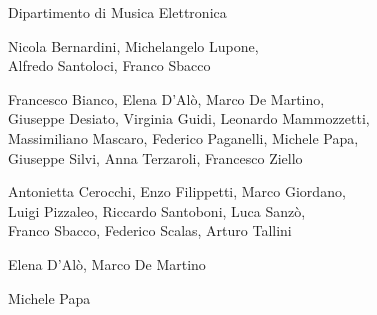 

%
%
	
{\fontsize{24}{22} }

\medskip

{\fontsize{12}{12} \textsf{Dipartimento di Musica Elettronica}}

\vspace{.5cm}

\textbf{}

Nicola Bernardini, Michelangelo Lupone, \\ Alfredo Santoloci, Franco Sbacco

\medskip

\textbf{}

Francesco Bianco, Elena D’Alò, Marco De Martino, \\ Giuseppe Desiato, Virginia Guidi, Leonardo Mammozzetti, \\ Massimiliano Mascaro, Federico Paganelli, Michele Papa, \\Giuseppe Silvi, Anna Terzaroli, Francesco Ziello  

\medskip

\textbf{}

Antonietta Cerocchi, Enzo Filippetti, Marco Giordano, \\Luigi Pizzaleo, Riccardo Santoboni, Luca Sanzò, \\ Franco Sbacco, Federico Scalas, Arturo Tallini

\medskip

\textbf{}

Elena D’Alò, Marco De Martino

\medskip

\textbf{}

Michele Papa

\medskip

